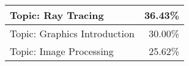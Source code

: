 \documentclass[sigconf,review]{acmart}
\begin{document}
\begin{table}
\begin{tabular}{|l|r|}
        Topic: Ray Tracing & 36.43\% \\ \hline
        Topic: Graphics Introduction & 30.00\% \\ \hline
        Topic: Image Processing & 25.62\% \\ \hline
    \end{tabular}
\end{table}
\end{document}
